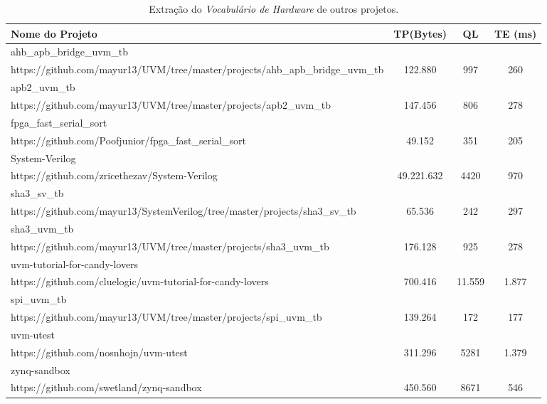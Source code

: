\documentclass[12pt, twocolumn, a4paper]{article}
\begin{document}
\begin{table*}[!htpb]

\centering
\caption{Extração do \textit{Vocabulário de Hardware} de outros projetos.}
	\begin{tabular}{l|c|c|c}
	\hline
	Nome do Projeto & TP(Bytes)& QL & TE (ms)\\
	\hline
	ahb\_apb\_bridge\_uvm\_tb&&&\\{\footnotesize https://github.com/mayur13/UVM/tree/master/projects/ahb\_apb\_bridge\_uvm\_tb}& 122.880 & 997 & 260\\

	\hline
	apb2\_uvm\_tb&&&\\{\footnotesize https://github.com/mayur13/UVM/tree/master/projects/apb2\_uvm\_tb}     & 147.456 & 806 & 278\\
	\hline
	fpga\_fast\_serial\_sort&&&\\{\footnotesize https://github.com/Poofjunior/fpga\_fast\_serial\_sort} 	   & 49.152 & 351 & 205\\
	\hline
	System-Verilog&&&\\{\footnotesize https://github.com/zricethezav/System-Verilog}   & 49.221.632 & 4420 & 970\\
	\hline
	sha3\_sv\_tb&&&\\{\footnotesize https://github.com/mayur13/SystemVerilog/tree/master/projects/sha3\_sv\_tb}       & 65.536 & 242 & 297 \\
	\hline
	sha3\_uvm\_tb&&&\\{\footnotesize https://github.com/mayur13/UVM/tree/master/projects/sha3\_uvm\_tb}& 176.128 & 925 & 278\\
	\hline
	uvm-tutorial-for-candy-lovers&&&\\{\footnotesize https://github.com/cluelogic/uvm-tutorial-for-candy-lovers}  & 700.416 & 11.559 & 1.877\\
	\hline
	spi\_uvm\_tb&&&\\{\footnotesize https://github.com/mayur13/UVM/tree/master/projects/spi\_uvm\_tb}      & 139.264 & 172 & 177\\
	\hline
	uvm-utest&&&\\{\footnotesize https://github.com/nosnhojn/uvm-utest}& 311.296 & 5281 & 1.379\\
	\hline
	zynq-sandbox&&&\\{\footnotesize https://github.com/swetland/zynq-sandbox}& 450.560 & 8671 & 546\\
	\hline
	\end{tabular}

\end{table*}	
	
\end{document}

